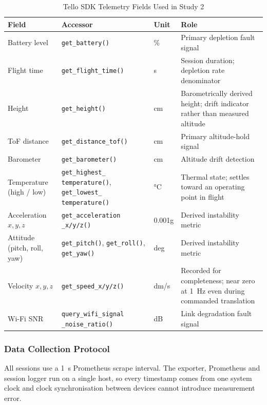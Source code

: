 \begin{table}[htbp]
\centering
\caption{Tello SDK Telemetry Fields Used in Study 2}
\label{tab:tello-fields}
\small
\begin{tabular}{|p{3.6cm}|p{4.4cm}|p{1.6cm}|p{4.2cm}|}
\hline
\textbf{Field} & \textbf{Accessor} & \textbf{Unit} & \textbf{Role} \\
\hline
Battery level & \texttt{get\_battery()} & \% & Primary depletion fault signal \\
\hline
Flight time & \texttt{get\_flight\_time()} & s & Session duration; depletion rate denominator \\
\hline
Height & \texttt{get\_height()} & cm & Barometrically derived height; drift indicator rather than measured altitude \\
\hline
ToF distance & \texttt{get\_distance\_tof()} & cm & Primary altitude-hold signal \\
\hline
Barometer & \texttt{get\_barometer()} & cm & Altitude drift detection \\
\hline
Temperature (high / low) & \texttt{get\_highest\_
temperature()}, \texttt{get\_lowest\_
temperature()} & \si{\celsius} & Thermal state; settles toward an operating point in flight \\
\hline
Acceleration $x,y,z$ & \texttt{get\_acceleration
\_x/y/z()} & 0.001g & Derived instability metric \\
\hline
Attitude (pitch, roll, yaw) & \texttt{get\_pitch()}, \texttt{get\_roll()}, \texttt{get\_yaw()} & deg & Derived instability metric \\
\hline
Velocity $x,y,z$ & \texttt{get\_speed\_x/y/z()} & dm/s & Recorded for completeness; near zero at \SI{1}{\hertz} even during commanded translation \\
\hline
Wi-Fi SNR & \texttt{query\_wifi\_signal
\_noise\_ratio()} & dB & Link degradation fault signal \\
\hline
\end{tabular}
\end{table}

\subsubsection{Data Collection Protocol}

All sessions use a \SI{1}{\second} Prometheus scrape interval. The exporter,
Prometheus and session logger run on a single host, so every timestamp comes from
one system clock and clock synchronisation between devices cannot introduce
measurement error.

